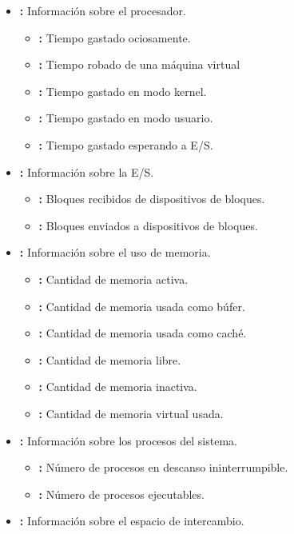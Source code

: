 \begin{itemize}
	\item{}\textbf{:} Información sobre el procesador.
	\begin{itemize}
		\item{}\textbf{:} Tiempo gastado ociosamente.
		\item{}\textbf{:} Tiempo robado de una máquina virtual
		\item{}\textbf{:} Tiempo gastado en modo kernel.
		\item{}\textbf{:} Tiempo gastado en modo usuario.
		\item{}\textbf{:} Tiempo gastado esperando a E/S.
	\end{itemize}
	\item{}\textbf{:} Información sobre la E/S.
	\begin{itemize}
		\item{}\textbf{:} Bloques recibidos de dispositivos de bloques.
		\item{}\textbf{:} Bloques enviados a dispositivos de bloques.
	\end{itemize}
	\item{}\textbf{:} Información sobre el uso de memoria.
	\begin{itemize}
		\item{}\textbf{:} Cantidad de memoria activa.
		\item{}\textbf{:} Cantidad de memoria usada como búfer.
		\item{}\textbf{:} Cantidad de memoria usada como caché.
		\item{}\textbf{:} Cantidad de memoria libre.
		\item{}\textbf{:} Cantidad de memoria inactiva.
		\item{}\textbf{:} Cantidad de memoria virtual usada.
	\end{itemize}
	\item{}\textbf{:} Información sobre los procesos del sistema.
	\begin{itemize}
		\item{}\textbf{:} Número de procesos en descanso ininterrumpible.
		\item{}\textbf{:} Número de procesos ejecutables.
	\end{itemize}
	\item{}\textbf{:} Información sobre el espacio de intercambio.
	\begin{itemize}

\end{itemize}
\end{itemize}
